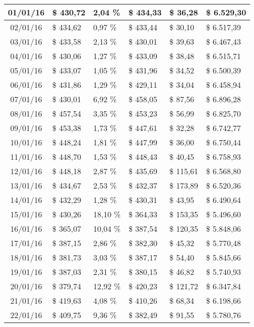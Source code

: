 \begin{small}
\begin{longtable}{|c|l|l|l|l|l|}
01/01/16 & \$ 430,72 & 2,04 \% & \$ 434,33 & \$ 36,28 & \$ 6.529,30 \\ \hline
02/01/16 & \$ 434,62 & 0,97 \% & \$ 433,44 & \$ 30,10 & \$ 6.517,39 \\ \hline
03/01/16 & \$ 433,58 & 2,13 \% & \$ 430,01 & \$ 39,63 & \$ 6.467,43 \\ \hline
04/01/16 & \$ 430,06 & 1,27 \% & \$ 433,09 & \$ 38,48 & \$ 6.515,71 \\ \hline
05/01/16 & \$ 433,07 & 1,05 \% & \$ 431,96 & \$ 34,52 & \$ 6.500,39 \\ \hline
06/01/16 & \$ 431,86 & 1,29 \% & \$ 429,11 & \$ 34,04 & \$ 6.458,94 \\ \hline
07/01/16 & \$ 430,01 & 6,92 \% & \$ 458,05 & \$ 87,56 & \$ 6.896,28 \\ \hline
08/01/16 & \$ 457,54 & 3,35 \% & \$ 453,23 & \$ 56,99 & \$ 6.825,70 \\ \hline
09/01/16 & \$ 453,38 & 1,73 \% & \$ 447,61 & \$ 32,28 & \$ 6.742,77 \\ \hline
10/01/16 & \$ 448,24 & 1,81 \% & \$ 447,99 & \$ 36,00 & \$ 6.750,44 \\ \hline
11/01/16 & \$ 448,70 & 1,53 \% & \$ 448,43 & \$ 40,45 & \$ 6.758,93 \\ \hline
12/01/16 & \$ 448,18 & 2,87 \% & \$ 435,69 & \$ 115,61 & \$ 6.568,80 \\ \hline
13/01/16 & \$ 434,67 & 2,53 \% & \$ 432,37 & \$ 173,89 & \$ 6.520,36 \\ \hline
14/01/16 & \$ 432,29 & 1,28 \% & \$ 430,31 & \$ 43,95 & \$ 6.490,64 \\ \hline
15/01/16 & \$ 430,26 & 18,10 \% & \$ 364,33 & \$ 153,35 & \$ 5.496,60 \\ \hline
16/01/16 & \$ 365,07 & 10,04 \% & \$ 387,54 & \$ 120,35 & \$ 5.848,06 \\ \hline
17/01/16 & \$ 387,15 & 2,86 \% & \$ 382,30 & \$ 45,32 & \$ 5.770,48 \\ \hline
18/01/16 & \$ 381,73 & 3,03 \% & \$ 387,17 & \$ 54,40 & \$ 5.845,66 \\ \hline
19/01/16 & \$ 387,03 & 2,31 \% & \$ 380,15 & \$ 46,82 & \$ 5.740,93 \\ \hline
20/01/16 & \$ 379,74 & 12,92 \% & \$ 420,23 & \$ 121,72 & \$ 6.347,84 \\ \hline
21/01/16 & \$ 419,63 & 4,08 \% & \$ 410,26 & \$ 68,34 & \$ 6.198,66 \\ \hline
22/01/16 & \$ 409,75 & 9,36 \% & \$ 382,49 & \$ 91,55 & \$ 5.780,76 \\ \hline

\end{longtable}
\end{small}
